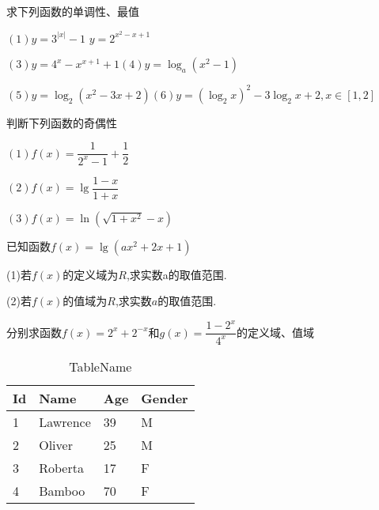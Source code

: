 \begin{example}求下列函数的单调性、最值\par
	$(1)y=3^{|x|}-1$  \hfil $y=2^{x^2-x+1}$\par
	\vspace*{3cm}
	$(3)y=4^x-x^{x+1}+1$\hfil $(4)y=\log_a(x^2-1)$\par
	\vspace*{3.5cm}
	$(5)y=\log_2(x^2-3x+2)$\hfil $(6)y=(\log_2x)^2-3\log_2x+2,x\in[1,2]$
	\vspace*{3.5cm}
\end{example}
\begin{example}判断下列函数的奇偶性\par
$(1)f(x)=\dfrac{1}{2^x-1}+\dfrac{1}{2}$\par
\vspace{3cm}
$(2)f(x)=\lg\dfrac{1-x}{1+x}$\par
\vspace{3cm}
$(3)f(x)=\ln(\sqrt{1+x^2}-x)$\par
\vspace{3cm}
\end{example}
\begin{example}已知函数$f(x)=\lg(ax^2+2x+1)$\par
	(1)若$f(x)$的定义域为$R$,求实数a的取值范围.\par
	\vspace{4cm}
	(2)若$f(x)$的值域为$R$,求实数$a$的取值范围.\par
	\vspace{4cm}
\end{example}
\begin{example}分别求函数$f(x)=2^x+2^{-x}$和$g(x)=\dfrac{1-2^x}{4^x}$的定义域、值域\par

\end{example}
\begin{table}
	\centering
	\caption{TableName}
	\begin{tabular}{|l|l|l|l|}
		\hline
		
		Id & Name & Age & Gender\\ \hline
		1 & Lawrence & 39 & M\\ \hline
		2 & Oliver & 25 & M\\ \hline
		3 & Roberta & 17 & F\\ \hline
		4 & Bamboo & 70 & F\\ \hline
		
	\end{tabular}
\end{table}

